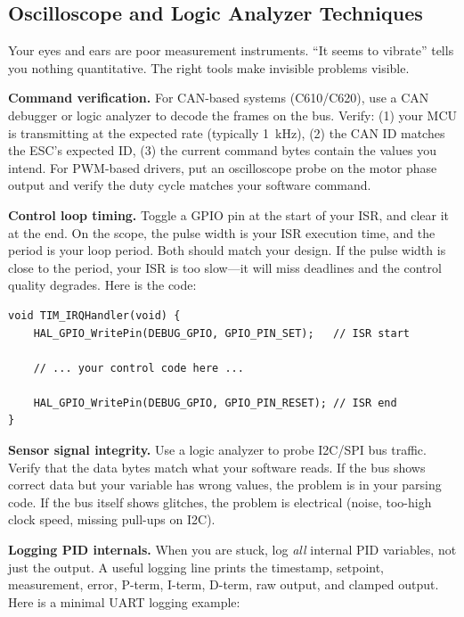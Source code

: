 \subsection{Oscilloscope and Logic Analyzer Techniques}

Your eyes and ears are poor measurement instruments. ``It seems to vibrate'' tells you nothing quantitative. The right tools make invisible problems visible.

\textbf{Command verification.} For CAN-based systems (C610/C620), use a CAN debugger or logic analyzer to decode the frames on the bus. Verify: (1) your MCU is transmitting at the expected rate (typically 1~kHz), (2) the CAN ID matches the ESC's expected ID, (3) the current command bytes contain the values you intend. For PWM-based drivers, put an oscilloscope probe on the motor phase output and verify the duty cycle matches your software command.

\textbf{Control loop timing.} Toggle a GPIO pin at the start of your ISR, and clear it at the end. On the scope, the pulse width is your ISR execution time, and the period is your loop period. Both should match your design. If the pulse width is close to the period, your ISR is too slow---it will miss deadlines and the control quality degrades. Here is the code:

\begin{verbatim}
void TIM_IRQHandler(void) {
    HAL_GPIO_WritePin(DEBUG_GPIO, GPIO_PIN_SET);   // ISR start

    // ... your control code here ...

    HAL_GPIO_WritePin(DEBUG_GPIO, GPIO_PIN_RESET); // ISR end
}
\end{verbatim}

\textbf{Sensor signal integrity.} Use a logic analyzer to probe I2C/SPI bus traffic. Verify that the data bytes match what your software reads. If the bus shows correct data but your variable has wrong values, the problem is in your parsing code. If the bus itself shows glitches, the problem is electrical (noise, too-high clock speed, missing pull-ups on I2C).

\textbf{Logging PID internals.} When you are stuck, log \textit{all} internal PID variables, not just the output. A useful logging line prints the timestamp, setpoint, measurement, error, P-term, I-term, D-term, raw output, and clamped output. Here is a minimal UART logging example:

